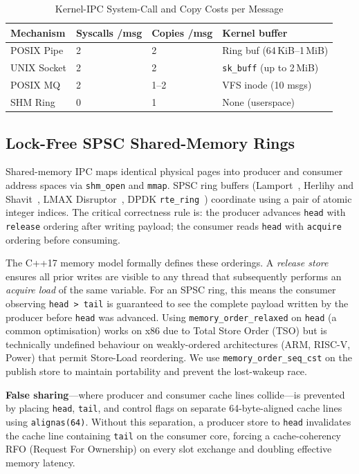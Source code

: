 \documentclass[10pt,conference]{IEEEtran}
\begin{document}
\begin{table}[H]
  \centering
  \caption{Kernel-IPC System-Call and Copy Costs per Message}
  \label{tab:ipc_cost}
  \small
  \begin{tabular}{@{}L{1.8cm}L{1.5cm}L{1.5cm}L{2.5cm}@{}}
    \toprule
    \textbf{Mechanism} & \textbf{Syscalls /msg} & \textbf{Copies /msg} & \textbf{Kernel buffer} \\
    \midrule
    POSIX Pipe   & 2 & 2 & Ring buf (64\,KiB--1\,MiB) \\
    UNIX Socket  & 2 & 2 & \texttt{sk\_buff} (up to 2\,MiB) \\
    POSIX MQ     & 2 & 1--2 & VFS inode (10 msgs) \\
    SHM Ring     & 0 & 1 & None (userspace) \\
    \bottomrule
  \end{tabular}
\end{table}

\subsection{Lock-Free SPSC Shared-Memory Rings}

Shared-memory IPC maps identical physical pages into producer and consumer
address spaces via \texttt{shm\_open} and \texttt{mmap}.  SPSC ring buffers
(Lamport~\cite{lamport1983}, Herlihy and Shavit~\cite{herlihy2008}, LMAX Disruptor~\cite{disruptor}, DPDK
\texttt{rte\_ring}~\cite{dpdk}) coordinate using a pair of atomic integer
indices.  The critical correctness rule is: the producer advances \texttt{head}
with \texttt{release} ordering after writing payload; the consumer reads
\texttt{head} with \texttt{acquire} ordering before consuming.

The C++17 memory model formally defines these orderings.  A \emph{release
store} ensures all prior writes are visible to any thread that subsequently
performs an \emph{acquire load} of the same variable.  For an SPSC ring, this
means the consumer observing \texttt{head~>~tail} is guaranteed to see the
complete payload written by the producer before \texttt{head} was advanced.
Using \texttt{memory\_order\_relaxed} on \texttt{head} (a common optimisation)
works on x86 due to Total Store Order (TSO) but is technically undefined
behaviour on weakly-ordered architectures (ARM, RISC-V, Power) that permit
Store-Load reordering.  We use \texttt{memory\_order\_seq\_cst} on the
publish store to maintain portability and prevent the lost-wakeup race.

\textbf{False sharing}---where producer and consumer cache lines collide---is
prevented by placing \texttt{head}, \texttt{tail}, and control flags on
separate 64-byte-aligned cache lines using \texttt{alignas(64)}.  Without this
separation, a producer store to \texttt{head} invalidates the cache line
containing \texttt{tail} on the consumer core, forcing a cache-coherency
RFO (Request For Ownership) on every slot exchange and doubling effective
memory latency.
\end{document}
